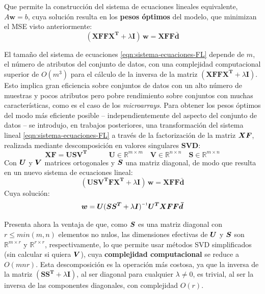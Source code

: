 \documentclass[00-Trabajo_Final.tex]{subfiles}
\begin{document}
\noindent Que permite la construcción del sistema de ecuaciones lineales equivalente, $A \boldsymbol{w} = b$, cuya solución resulta en los \textbf{pesos óptimos} del modelo, que minimizan el MSE visto anteriormente:
\begin{equation} \label{eqn:sistema-ecuaciones-FL}
    (\boldsymbol{XFFX^T} + \lambda\boldsymbol{I})\,\boldsymbol{w} = \boldsymbol{XFF\bar{d}}
\end{equation}

El tamaño del sistema de ecuaciones \eqref{eqn:sistema-ecuaciones-FL} depende de $m$, el número de atributos del conjunto de datos, con una complejidad computacional superior de $O(m^3)$ para el cálculo de la inversa de la matriz $(\boldsymbol{XFFX^T} + \lambda\boldsymbol{I})$. Esto implica gran eficiencia sobre conjuntos de datos con un alto número de muestras y pocos atributos pero pobre rendimiento sobre conjuntos con muchas características, como es el caso de los \textit{microarrays}. Para obtener los pesos óptimos del modo más eficiente posible{ }--{ }independientemente del aspecto del conjunto de datos{ }--{ }se introdujo, en trabajos posteriores, una transformación del sistema lineal \eqref{eqn:sistema-ecuaciones-FL} a través de la factorización de la matriz $\boldsymbol{XF}$, realizada mediante descomposición en valores singulares \textbf{SVD}:
\begin{equation*}
    \boldsymbol{XF} = \boldsymbol{USV^T}\quad \quad 
    \quad \boldsymbol{U} \in \mathbb{R}^{m \times m}\quad \boldsymbol{V} \in \mathbb{R}^{n \times n}\quad \boldsymbol{S} \in \mathbb{R}^{m \times n}
\end{equation*}
\noindent Con $\boldsymbol{U}$ y $\boldsymbol{V}$ matrices ortogonales y $\boldsymbol{S}$ una matriz diagonal, de modo que resulta en un nuevo sistema de ecuaciones lineal:
\begin{equation}
    (\boldsymbol{USV^TFX^T} + \lambda\boldsymbol{I})\, \boldsymbol{w} = \boldsymbol{XFF\bar{d}}
\end{equation}
Cuya solución:
\begin{equation}\label{eqn:solucion_svd_fedheonn}
    \boldsymbol{w} = \boldsymbol{U}(\boldsymbol{SS^T} + \lambda \boldsymbol{I})\inv\boldsymbol{U^TXFF\bar{d}}
\end{equation}

Presenta ahora la ventaja de que, como $\boldsymbol{S}$ es una matriz diagonal con $r \le min(m,n)$ elementos no nulos, las dimensiones efectivas de $\boldsymbol{U}$ y $\boldsymbol{S}$ son $\mathbb{R}^{m \times r}$ y $\mathbb{R}^{r \times r}$, respectivamente, lo que permite usar métodos SVD simplificados (sin calcular si quiera $\boldsymbol{V}$), cuya \textbf{complejidad computacional} se reduce a $O(mnr)$. Esta descomposición es la operación más costosa, ya que la inversa de la matriz $(\boldsymbol{SS^T} + \lambda \boldsymbol{I})$, al ser diagonal para cualquier $\lambda \neq 0$, es trivial, al ser la inversa de las componentes diagonales, con complejidad $O(r)$.
\end{document}
